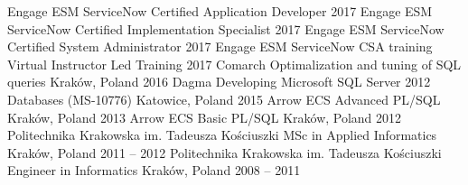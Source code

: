 \begin{cventries}
	\cventry
		{Engage ESM}
		{ServiceNow Certified Application Developer}
		{}
		{2017}
		{}
	\cventry
		{Engage ESM}
		{ServiceNow Certified Implementation Specialist}
		{}
		{2017}
		{}
	\cventry
		{Engage ESM}
		{ServiceNow Certified System Administrator}
		{}
		{2017}
		{}
	\cventry
		{Engage ESM}
		{ServiceNow CSA training}
		{Virtual Instructor Led Training}
		{2017}
		{}
	\cventry
		{Comarch}
		{Optimalization and tuning of SQL queries}
		{Kraków, Poland}
		{2016}
		{}
  	\cventry
  		{Dagma}
  		{Developing Microsoft SQL Server 2012 Databases (MS-10776)}
  		{Katowice, Poland}
  		{2015}
  		{}
  	\cventry
  		{Arrow ECS}
  		{Advanced PL/SQL}
  		{Kraków, Poland}
  		{2013}
  		{}
  	\cventry
		{Arrow ECS}
		{Basic PL/SQL}
		{Kraków, Poland}
		{2012}
		{}
  	\cventry
  		{Politechnika Krakowska im. Tadeusza Kościuszki}
    	{MSc in Applied Informatics}
    	{Kraków, Poland}
    	{2011 -- 2012}
    	{}
  	\cventry
    	{Politechnika Krakowska im. Tadeusza Kościuszki}
    	{Engineer in Informatics}
    	{Kraków, Poland}
    	{2008 -- 2011}
    	{}
\end{cventries}
